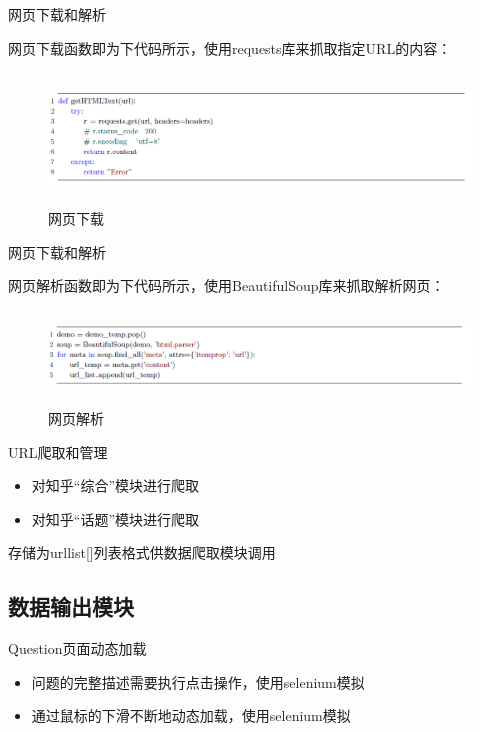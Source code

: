 \documentclass[aspectratio=169]{beamer}
\begin{document}
\begin{frame}{网页下载和解析}
\begin{block}{网页下载函数即为下代码所示，使用requests库来抓取指定URL的内容：}\end{block}
\begin{figure}
  \centering
  \includegraphics[width=13cm,height=3.5cm]{网页下载}
  \caption{网页下载}
\end{figure}
\end{frame}

\begin{frame}{网页下载和解析}
\begin{block}{网页解析函数即为下代码所示，使用BeautifulSoup库来抓取解析网页：}\end{block}
\begin{figure}
  \centering
  \includegraphics[width=13cm,height=2.5cm]{网页解析}
  \caption{网页解析}
\end{figure}
\end{frame}

\begin{frame}{URL爬取和管理}
\begin{itemize}
  \item 对知乎“综合”模块进行爬取
  \item 对知乎“话题”模块进行爬取
\end{itemize}
\begin{block}{存储为urllist[]列表格式供数据爬取模块调用}\end{block}
\end{frame}

\subsection{数据输出模块}
\begin{frame}{Question页面动态加载}
\begin{itemize}
  \item 问题的完整描述需要执行点击操作，使用selenium模拟
  \item 通过鼠标的下滑不断地动态加载，使用selenium模拟
\end{itemize}
\end{frame}
\end{document}
